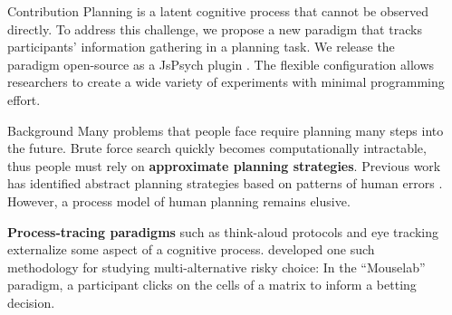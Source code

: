 \documentclass[final]{beamer}
\newlength{\sepwid}
\newlength{\onecolwid}
\begin{document}
\begin{frame}[t, fragile] %
\begin{columns}[t] %
\begin{column}{\sepwid}\end{column} %


\begin{column}{\onecolwid} %
  \begin{block}{Contribution}\label{contribution}
    Planning is a latent cognitive process that cannot be observed directly.
    To address this challenge, we propose a new paradigm that tracks participants' information gathering in a planning task.
    We release the paradigm open-source as a JsPsych plugin \cite{DeLeeuw2015}.
    The flexible configuration allows researchers to create a wide variety of experiments with minimal programming effort.
  \end{block}


  \begin{block}{Background}\label{Background}
    Many problems that people face require planning many steps into the future.
    Brute force search quickly becomes computationally intractable, thus people must rely on \textbf{approximate planning strategies}.
    Previous work has identified abstract planning strategies based on patterns of human errors \cite{Huys2015}.
    However, a process model of human planning remains elusive.

    \textbf{Process-tracing paradigms} such as think-aloud protocols and eye tracking externalize some aspect of a cognitive process.  developed one such methodology for studying multi-alternative risky choice: In the ``Mouselab'' paradigm, a participant clicks on the cells of a matrix to inform a betting decision.
  \end{block}


\end{column}
\end{columns}
\end{frame}
\end{document}
